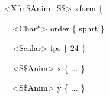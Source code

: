 \documentclass[a4paper]{article}
\newcommand\textstyleOOoComputerKeyWord[1]{\textrm{\textcolor[rgb]{0.0,0.0,0.5019608}{#1}}}
\newcommand\textstyleOOoAssemblerSpecialChar[1]{\textrm{\textcolor[rgb]{0.0,0.5019608,0.0}{#1}}}
\newcommand\textstyleOOoAssemblerIdent[1]{\textrm{\textcolor{black}{#1}}}
\newcommand\textstyleOOoAssemblerLiteral[1]{\textrm{\textcolor[rgb]{0.49803922,0.0,0.49803922}{#1}}}
\begin{document}
{\color{black}
\textstyleOOoComputerKeyWord{\textcolor{black}{\ \ \ \ \ \ \ \ \ \ }}\textstyleOOoAssemblerSpecialChar{{\textless}}\textstyleOOoAssemblerIdent{Xfm}\textstyleOOoAssemblerSpecialChar{\$}\textstyleOOoAssemblerIdent{Anim\_S}\textstyleOOoAssemblerSpecialChar{\${\textgreater}}\textstyleOOoComputerKeyWord{\textcolor{black}{
}}\textstyleOOoAssemblerIdent{xform}\textstyleOOoComputerKeyWord{\textcolor{black}{
}}\textstyleOOoAssemblerSpecialChar{\{}}

{\color{black}
\textstyleOOoComputerKeyWord{\textcolor{black}{\ \ \ \ \ \ \ \ \ \ \ \ }}\textstyleOOoAssemblerSpecialChar{{\textless}}\textstyleOOoAssemblerIdent{Char}\textstyleOOoAssemblerSpecialChar{*{\textgreater}}\textstyleOOoComputerKeyWord{\textcolor{black}{
}}\textstyleOOoAssemblerIdent{order}\textstyleOOoComputerKeyWord{\textcolor{black}{
}}\textstyleOOoAssemblerSpecialChar{\{}\textstyleOOoComputerKeyWord{\textcolor{black}{
}}\textstyleOOoAssemblerIdent{sphrt}\textstyleOOoComputerKeyWord{\textcolor{black}{
}}\textstyleOOoAssemblerSpecialChar{\}}}

{\color{black}
\textstyleOOoComputerKeyWord{\textcolor{black}{\ \ \ \ \ \ \ \ \ \ \ \ }}\textstyleOOoAssemblerSpecialChar{{\textless}}\textstyleOOoAssemblerIdent{Scalar}\textstyleOOoAssemblerSpecialChar{{\textgreater}}\textstyleOOoComputerKeyWord{\textcolor{black}{
}}\textstyleOOoAssemblerIdent{fps}\textstyleOOoComputerKeyWord{\textcolor{black}{
}}\textstyleOOoAssemblerSpecialChar{\{}\textstyleOOoComputerKeyWord{\textcolor{black}{
}}\textstyleOOoAssemblerLiteral{24}\textstyleOOoComputerKeyWord{\textcolor{black}{
}}\textstyleOOoAssemblerSpecialChar{\}}}

{\color{black}
\textstyleOOoComputerKeyWord{\textcolor{black}{\ \ \ \ \ \ \ \ \ \ \ \ }}\textstyleOOoAssemblerSpecialChar{{\textless}}\textstyleOOoAssemblerIdent{S}\textstyleOOoAssemblerSpecialChar{\$}\textstyleOOoAssemblerIdent{Anim}\textstyleOOoAssemblerSpecialChar{{\textgreater}}\textstyleOOoComputerKeyWord{\textcolor{black}{
}}\textstyleOOoAssemblerIdent{x}\textstyleOOoComputerKeyWord{\textcolor{black}{
}}\textstyleOOoAssemblerSpecialChar{\{}\textstyleOOoComputerKeyWord{\textcolor{black}{
}}\textstyleOOoAssemblerIdent{...}\textstyleOOoComputerKeyWord{\textcolor{black}{
}}\textstyleOOoAssemblerSpecialChar{\}}}

{\color{black}
\textstyleOOoComputerKeyWord{\textcolor{black}{\ \ \ \ \ \ \ \ \ \ \ \ }}\textstyleOOoAssemblerSpecialChar{{\textless}}\textstyleOOoAssemblerIdent{S}\textstyleOOoAssemblerSpecialChar{\$}\textstyleOOoAssemblerIdent{Anim}\textstyleOOoAssemblerSpecialChar{{\textgreater}}\textstyleOOoComputerKeyWord{\textcolor{black}{
}}\textstyleOOoAssemblerIdent{y}\textstyleOOoComputerKeyWord{\textcolor{black}{
}}\textstyleOOoAssemblerSpecialChar{\{}\textstyleOOoComputerKeyWord{\textcolor{black}{
}}\textstyleOOoAssemblerIdent{...}\textstyleOOoComputerKeyWord{\textcolor{black}{
}}\textstyleOOoAssemblerSpecialChar{\}}}
\end{document}
